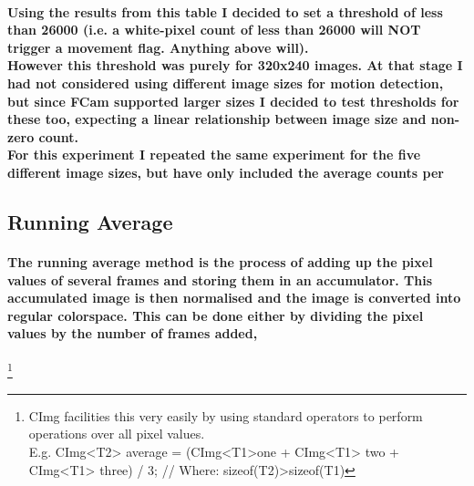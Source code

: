 \documentclass[11pt]{article} %
\begin{document}
\paragraph{Using the results from this table I decided to set a threshold of less than 26000 (i.e. a white-pixel count of less than 26000 will NOT trigger a movement flag. Anything above will). 
\\However this threshold was purely for 320x240 images. At that stage I had not considered using different image sizes  for motion detection, but since FCam supported larger sizes I decided to test thresholds for these too, expecting a linear relationship between image size and non-zero count.
\\For this experiment I repeated the same experiment for the five different image sizes, but have only included the average counts per }





\subsection{Running Average}
\paragraph{The running average method is the process of adding up the pixel values of several frames and storing them in an accumulator. This accumulated image is then normalised and the image is converted into regular colorspace. This can be done either by dividing the pixel values by the number of frames added, 
}
\footnote{CImg facilities this very easily by using standard operators to perform operations over all pixel values.\\ E.g.  CImg<T2> average =  (CImg<T1>one + CImg<T1> two + CImg<T1> three) / 3; // Where: sizeof(T2)>sizeof(T1)} 
\end{document}
